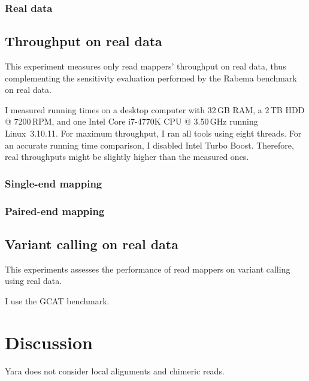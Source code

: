 \subsubsection{Real data}


\subsection{Throughput on real data}

This experiment measures only read mappers' throughput on real data, thus complementing the sensitivity evaluation performed by the Rabema benchmark on real data.

I measured running times on a desktop computer with 32\,GB RAM, a 2\,TB HDD @ 7200\,RPM, and one Intel Core i7-4770K CPU @ 3.50\,GHz running Linux~3.10.11.
For maximum throughput, I ran all tools using eight threads.
For an accurate running time comparison, I disabled Intel Turbo Boost.
Therefore, real throughputs might be slightly higher than the measured ones.


\subsubsection{Single-end mapping}
\subsubsection{Paired-end mapping}

\subsection{Variant calling on real data}

This experiments assesses the performance of read mappers on variant calling using real data.

I use the GCAT benchmark.


\section{Discussion}

Yara does not consider local alignments and chimeric reads.
